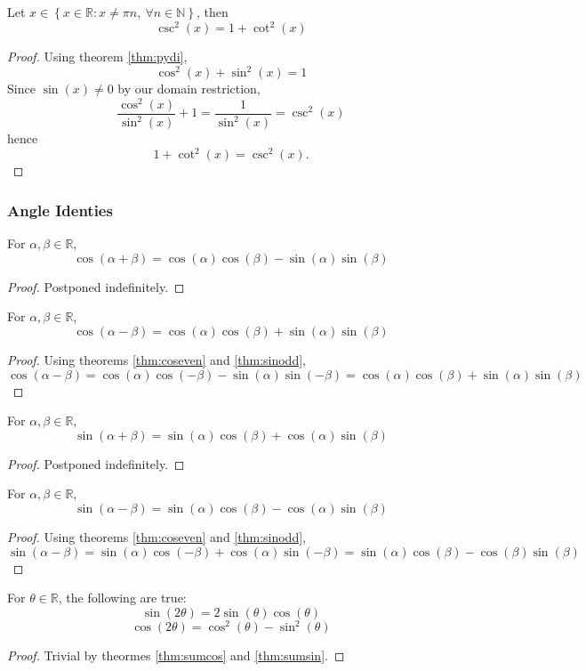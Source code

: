 \documentclass[11pt]{article}
\numberwithin{lemma}{section}
\numberwithin{equation}{section}
\numberwithin{define}{section}
\numberwithin{prop}{section}
\numberwithin{figure}{section}
\numberwithin{theorem}{section}
\numberwithin{cor}{section}
\numberwithin{ex}{section}
\def\real{\mathbb{R}}
\def\nat{\mathbb{N}}
\def\cbrak#1{\left\{#1\right\}}
\begin{document}
\begin{cor}
	Let $x\in \cbrak{x\in\real: x\neq \pi n, \: 
\forall n\in\nat}$, then
$$\csc^2(x)=1+\cot^2(x)$$
\end{cor}
\begin{proof}
	Using theorem \eqref{thm:pydi},
	$$\cos^2(x)+\sin^2(x)=1$$
	Since $\sin(x)\neq0$ by our domain restriction,
	$$\frac{\cos^2(x)}{\sin^2(x)}+1=\frac{1}{\sin^2(x)}=\csc^2(x)$$
	hence
	$$1+\cot^2(x)=\csc^2(x).$$
\end{proof}

\subsubsection{Angle Identies}
\begin{theorem}
\label{thm:sumcos}
For $\alpha,\beta\in\real$,
$$\cos(\alpha+\beta)=\cos(\alpha)\cos(\beta)-\sin(\alpha)\sin(\beta)$$
\end{theorem}
\begin{proof}
	Postponed indefinitely.
\end{proof}
\begin{cor}
	For $\alpha,\beta\in\real$,
$$\cos(\alpha-\beta)=\cos(\alpha)\cos(\beta)+\sin(\alpha)\sin(\beta)$$
\end{cor}
\begin{proof}
	Using theorems \eqref{thm:coseven} and \eqref{thm:sinodd},
	$$\cos(\alpha-\beta)=
	\cos(\alpha)\cos(-\beta)-\sin(\alpha)\sin(-\beta)=
	\cos(\alpha)\cos(\beta)+\sin(\alpha)\sin(\beta)$$
\end{proof}

\begin{theorem}
\label{thm:sumsin}
For $\alpha,\beta\in\real$,
$$\sin(\alpha+\beta)=\sin(\alpha)\cos(\beta)+\cos(\alpha)\sin(\beta)$$
\end{theorem}
\begin{proof}
	Postponed indefinitely.
\end{proof}

\begin{cor}
	For $\alpha,\beta\in\real$,
$$\sin(\alpha-\beta)=\sin(\alpha)\cos(\beta)-\cos(\alpha)\sin(\beta)$$
\end{cor}
\begin{proof}
	Using theorems \eqref{thm:coseven} and \eqref{thm:sinodd},
	$$\sin(\alpha-\beta)=\sin(\alpha)\cos(-\beta)+\cos(\alpha)\sin(-\beta)
	=\sin(\alpha)\cos(\beta)-\cos(\beta)\sin(\beta)$$
\end{proof}

\begin{cor}
	For $\theta\in\real$, the following are true:
	$$\sin(2\theta)=2\sin(\theta)\cos(\theta)$$
	$$\cos(2\theta)=\cos^2(\theta)-\sin^2(\theta)$$
	\label{cor:doubleangle}
\end{cor}
\begin{proof}
	Trivial by theormes \eqref{thm:sumcos} and \eqref{thm:sumsin}.
\end{proof}
\end{document}
